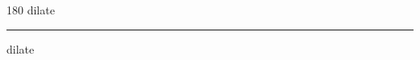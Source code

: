 
\begin{frame}
\begin{center}
\begin{turn}{180}
{\fontsize{2.5cm}{1em}\selectfont dilate}
\end{turn}
\vspace{1em}\par  
\hrule
\vspace{1em}\par  
{\fontsize{2.5cm}{1em}\selectfont dilate}
\end{center}
\end{frame}
